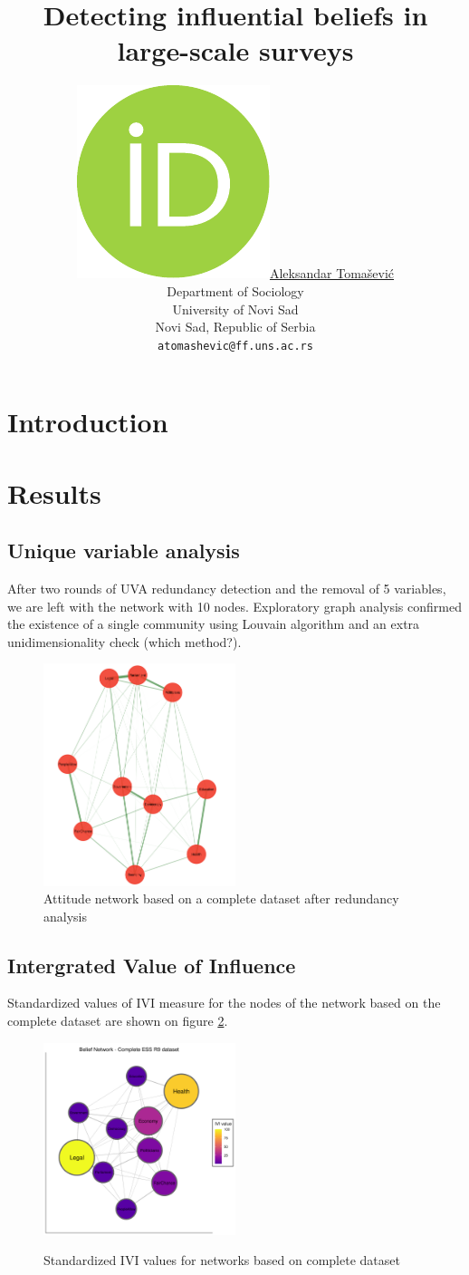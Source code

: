 \documentclass{article}
\title{Detecting influential beliefs in large-scale surveys}
\author{ \href{https://orcid.org/0000-0003-4863-6051}{\includegraphics[scale=0.06]{orcid.pdf}\hspace{1mm}Aleksandar Tomašević} \\
	Department of Sociology\\
	University of Novi Sad\\
	Novi Sad, Republic of Serbia\\
	\texttt{atomashevic@ff.uns.ac.rs}
}
\begin{document}
\maketitle

\section{Introduction}
\newpage
\section{Results}
\subsection{Unique variable analysis}

After two rounds of UVA redundancy detection
and the removal of 5 variables, we are left with the network with 10 nodes. Exploratory graph analysis confirmed the existence of a single community using Louvain algorithm and an extra unidimensionality check (which method?).

\begin{figure}[ht]
	\centering
	\label{fig:egafull}
	\includegraphics[width=0.5\textwidth]{figures/01-ega-full.png}
	\caption{Attitude network based on a complete dataset after redundancy analysis}
\end{figure}

\subsection{Intergrated Value of Influence}

Standardized values of IVI measure for the nodes of the network based on the complete dataset are shown on figure \ref{fig:ivifull}.

\begin{figure}[ht]
	\centering
	\includegraphics[width=0.5\textwidth]{figures/02-ivi-full.png}
	\label{fig:ivifull}
	\caption{Standardized IVI values for networks based on complete dataset}
\end{figure}
\end{document}
